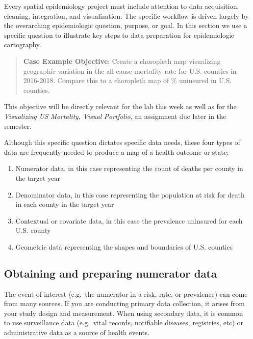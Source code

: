 \documentclass[
]{book}
\providecommand{\tightlist}{%
  \setlength{\itemsep}{0pt}\setlength{\parskip}{0pt}}
\begin{document}
Every spatial epidemiology project must include attention to data acquisition, cleaning, integration, and visualization. The specific workflow is driven largely by the overarching epidemiologic question, purpose, or goal. In this section we use a specific question to illustrate key steps to data preparation for epidemiologic cartography.

\begin{quote}
\textbf{Case Example Objective}: Create a choropleth map visualizing geographic variation in the all-cause mortality rate for U.S. counties in 2016-2018. Compare this to a choropleth map of \% uninsured in U.S. counties.
\end{quote}

This objective will be directly relevant for the lab this week as well as for the \emph{Visualizing US Mortality, Visual Portfolio}, an assignment due later in the semester.

Although this specific question dictates specific data needs, these four types of data are frequently needed to produce a map of a health outcome or state:

\begin{enumerate}
\def\labelenumi{\arabic{enumi}.}
\tightlist
\item
  Numerator data, in this case representing the count of deaths per county in the target year
\item
  Denominator data, in this case representing the population at risk for death in each county in the target year
\item
  Contextual or covariate data, in this case the prevalence uninsured for each U.S. county
\item
  Geometric data representing the shapes and boundaries of U.S. counties
\end{enumerate}

\hypertarget{obtaining-and-preparing-numerator-data}{%
\subsection{Obtaining and preparing numerator data}\label{obtaining-and-preparing-numerator-data}}

The event of interest (e.g.~the numerator in a risk, rate, or prevalence) can come from many sources. If you are conducting primary data collection, it arises from your study design and measurement. When using secondary data, it is common to use surveillance data (e.g.~vital records, notifiable diseases, registries, etc) or administrative data as a source of health events.
\end{document}
